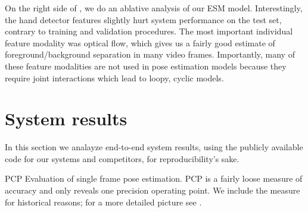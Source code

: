 On the right side of , we do an ablative analysis of our ESM 
model.  Interestingly, the hand detector features slightly hurt system 
performance on the test set, contrary to training and validation procedures.  
The most important individual feature modality was optical flow, which gives us 
a fairly good estimate of foreground/background separation in many video 
frames.  Importantly, many of these feature modalities are not used in pose 
estimation models because they require joint interactions which lead to loopy, 
cyclic models.


\section{System results}\label{sec:system-results}
In this section we analayze end-to-end system results, using the publicly 
available code for our systems and competitors, for reproducibility's sake.
\begin{table}[tb]
\begin{center}

\caption[PCP evaluation.]{PCP Evaluation of single frame pose estimation. PCP 
is a fairly loose measure of accuracy and only reveals one precision operating 
point.  We include the measure for historical reasons; for a more detailed 
picture see .}
\label{tab:res-table} 
\end{center}
\end{table}



